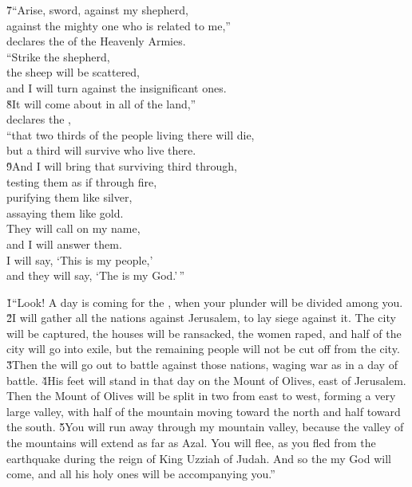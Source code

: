 \begin{poetry}
\poeml \v{7}``Arise, sword, against my shepherd, \\
\poemll    against the mighty one who is related to me,'' \\
\poemlll       declares the  of the Heavenly Armies. \\
\poeml ``Strike the shepherd, \\
\poemll    the sheep will be scattered, \\
\poemlll       and I will turn against the insignificant ones. \\
\poeml \v{8}It will come about in all of the land,'' \\
\poemll    declares the , \\
\poeml ``that two thirds of the people living there will die, \\
\poemll    but a third will survive who live there. \\
\poeml \v{9}And I will bring that surviving third through, \\
\poemll    testing them as if through fire, \\
\poeml purifying them like silver, \\
\poemll    assaying them like gold. \\
\poeml They will call on my name, \\
\poemll    and I will answer them. \\
\poeml I will say, `This is my people,' \\
\poemll    and they will say, `The  is my God.'\,''
\end{poetry}

\v{1}``Look! A day is coming for the , when your plunder will be divided among you. \v{2}I will gather all the nations against Jerusalem, to lay siege against it. The city will be captured, the houses will be ransacked, the women raped, and half of the city will go into exile, but the remaining people will not be cut off from the city. \v{3}Then the  will go out to battle against those nations, waging war as in a day of battle. \v{4}His feet will stand in that day on the Mount of Olives, east of Jerusalem. Then the Mount of Olives will be split in two from east to west, forming a very large valley, with half of the mountain moving toward the north and half toward the south. \v{5}You will run away through my mountain valley, because the valley of the mountains will extend as far as Azal. You will flee, as you fled from the earthquake during the reign of King Uzziah of Judah. And so the  my God will come, and all his holy ones will be accompanying you.''

